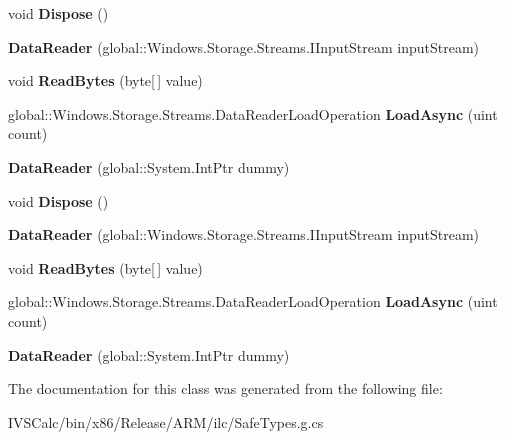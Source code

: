 \begin{DoxyCompactItemize}
void {\bfseries Dispose} ()
\item 
\mbox{\label{class_windows_1_1_storage_1_1_streams_1_1_data_reader_a5898ae07f0205f604d43e9c687b92944}} 
{\bfseries Data\+Reader} (global\+::\+Windows.\+Storage.\+Streams.\+I\+Input\+Stream input\+Stream)
\item 
\mbox{\label{class_windows_1_1_storage_1_1_streams_1_1_data_reader_a3ef0353a0e8404fcce465021822f372f}} 
void {\bfseries Read\+Bytes} (byte\mbox{[}$\,$\mbox{]} value)
\item 
\mbox{\label{class_windows_1_1_storage_1_1_streams_1_1_data_reader_a8851a4d0dcb16463f109906d39321a9d}} 
global\+::\+Windows.\+Storage.\+Streams.\+Data\+Reader\+Load\+Operation {\bfseries Load\+Async} (uint count)
\item 
\mbox{\label{class_windows_1_1_storage_1_1_streams_1_1_data_reader_a7190172f276be7251509999eeed10931}} 
{\bfseries Data\+Reader} (global\+::\+System.\+Int\+Ptr dummy)
\item 
\mbox{\label{class_windows_1_1_storage_1_1_streams_1_1_data_reader_a6010f889660514f452ca98b0453d9573}} 
void {\bfseries Dispose} ()
\item 
\mbox{\label{class_windows_1_1_storage_1_1_streams_1_1_data_reader_a5898ae07f0205f604d43e9c687b92944}} 
{\bfseries Data\+Reader} (global\+::\+Windows.\+Storage.\+Streams.\+I\+Input\+Stream input\+Stream)
\item 
\mbox{\label{class_windows_1_1_storage_1_1_streams_1_1_data_reader_a3ef0353a0e8404fcce465021822f372f}} 
void {\bfseries Read\+Bytes} (byte\mbox{[}$\,$\mbox{]} value)
\item 
\mbox{\label{class_windows_1_1_storage_1_1_streams_1_1_data_reader_a8851a4d0dcb16463f109906d39321a9d}} 
global\+::\+Windows.\+Storage.\+Streams.\+Data\+Reader\+Load\+Operation {\bfseries Load\+Async} (uint count)
\item 
\mbox{\label{class_windows_1_1_storage_1_1_streams_1_1_data_reader_a7190172f276be7251509999eeed10931}} 
{\bfseries Data\+Reader} (global\+::\+System.\+Int\+Ptr dummy)
\end{DoxyCompactItemize}


The documentation for this class was generated from the following file\+:\begin{DoxyCompactItemize}
\item 
I\+V\+S\+Calc/bin/x86/\+Release/\+A\+R\+M/ilc/Safe\+Types.\+g.\+cs\end{DoxyCompactItemize}
